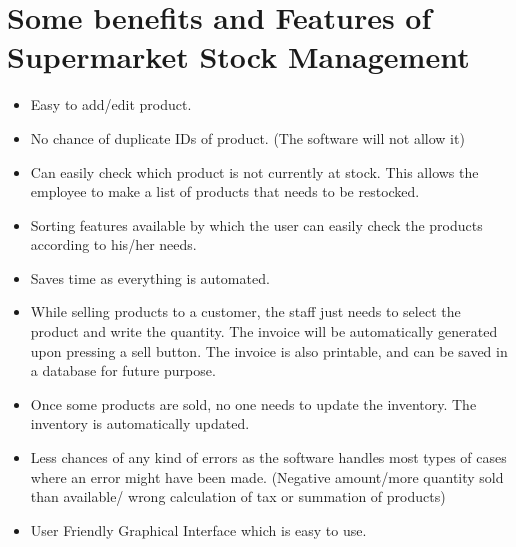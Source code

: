 \documentclass{article}
\begin{document}
{}
\section*{\LARGE Some benefits and Features of Supermarket Stock Management}
\large 
\begin{itemize}
    \item \large Easy to add/edit product.
    \item \large No chance of duplicate IDs of product. (The software will not allow it)
    \item \large Can easily check which product is not currently at stock. This allows the employee to make a list of products that needs to be restocked. 
    \item \large Sorting features available by which the user can easily check the products according to his/her needs. 
    \item \large Saves time as everything is automated. 
    \item \large While selling products to a customer, the staff just needs to select the product and write the quantity. The invoice will be automatically generated upon pressing a sell button. The invoice is also printable, and can be saved in a database for future purpose.
    \item \large Once some products are sold, no one needs to update the inventory. The inventory is automatically updated.
    \item \large Less chances of any kind of errors as the software handles most types of cases where an error might have been made. (Negative amount/more quantity sold than available/ wrong calculation of tax or summation of products)
    \item \large User Friendly Graphical Interface which is easy to use.
    
\end{itemize}

\pagebreak


{}
\end{document}
